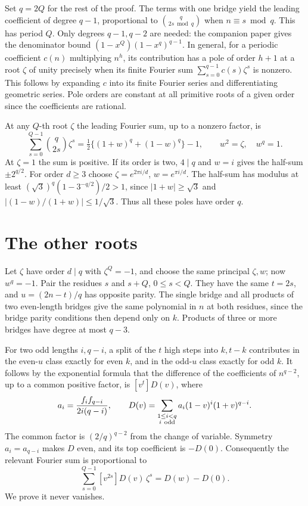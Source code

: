 \documentclass[11pt,letterpaper]{article}
\begin{document}
Set \(q=2Q\) for the rest of the proof. The terms with one bridge yield the leading coefficient of degree \(q-1\), proportional to \(\binom q{2s\bmod q}\) when \(n\equiv s\bmod q\). This has period \(Q\). Only degrees \(q-1,q-2\) are needed: the companion paper gives the denominator bound \((1-x^Q)(1-x^q)^{q-1}\). In general, for a periodic coefficient \(c(n)\) multiplying \(n^h\), its contribution has a pole of order \(h+1\) at a root \(\zeta\) of unity precisely when its finite Fourier sum \(\sum_{s=0}^{q-1}c(s)\zeta^s\) is nonzero. This follows by expanding \(c\) into its finite Fourier series and differentiating geometric series. Pole orders are constant at all primitive roots of a given order since the coefficients are rational.

At any \(Q\)-th root \(\zeta\) the leading Fourier sum, up to a nonzero factor, is
\[
 \sum_{s=0}^{Q-1}\binom q{2s}\zeta^s
  =\tfrac12\{(1+w)^q+(1-w)^q\}-1,\qquad w^2=\zeta,\quad w^q=1 .
\]
At \(\zeta=1\) the sum is positive. If its order is two, \(4\mid q\) and \(w=i\) gives the half-sum \(\pm 2^{q/2}\). For order \(d\ge3\) choose \(\zeta=e^{2\pi i/d}\), \(w=e^{\pi i/d}\). The half-sum has modulus at least \((\sqrt3)^q(1-3^{-q/2})/2>1\), since \(|1+w|\ge\sqrt3\) and \(|(1-w)/(1+w)|\le1/\sqrt3\). Thus all these poles have order \(q\).

\section{The other roots}
Let \(\zeta\) have order \(d\mid q\) with \(\zeta^Q=-1\), and choose the same principal \(\zeta,w\); now \(w^q=-1\). Pair the residues \(s\) and \(s+Q\), \(0\le s<Q\). They have the same \(t=2s\), and \(u=(2n-t)/q\) has opposite parity. The single bridge and all products of two even-length bridges give the same polynomial in \(n\) at both residues, since the bridge parity conditions then depend only on \(k\). Products of three or more bridges have degree at most \(q-3\).

For two odd lengths \(i,q-i\), a split of the \(t\) high steps into \(k,t-k\) contributes in the even-\(u\) class exactly for even \(k\), and in the odd-\(u\) class exactly for odd \(k\). It follows by the exponential formula that the difference of the coefficients of \(n^{q-2}\), up to a common positive factor, is \([v^t]D(v)\), where
\[
 a_i=\frac{f_i f_{q-i}}{2i(q-i)},\qquad
 D(v)=\sum_{\substack{1\le i<q\\i\ {\rm odd}}}a_i(1-v)^i(1+v)^{q-i}.
\]
The common factor is \((2/q)^{q-2}\) from the change of variable. Symmetry \(a_i=a_{q-i}\) makes \(D\) even, and its top coefficient is \(-D(0)\). Consequently the relevant Fourier sum is proportional to
\[
 \sum_{s=0}^{Q-1}[v^{2s}]D(v)\,\zeta^s=D(w)-D(0).
 \tag{1}
\]
We prove it never vanishes.
\end{document}

